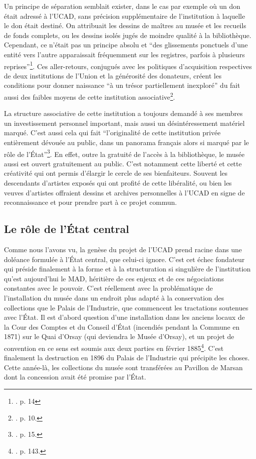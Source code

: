 Un principe de séparation semblait exister, dans le cas par exemple où un don était adressé à l'UCAD, sans précision supplémentaire de l'institution à laquelle le don était destiné. On attribuait les dessins de maîtres au musée et les recueils de fonds complets, ou les dessins isolés jugés de moindre qualité à la bibliothèque. Cependant, ce n'était pas un principe absolu et \enquote{des glissements ponctuels d'une entité vers l'autre apparaissait fréquemment sur les registres, parfois à plusieurs reprises}\footnote{\cite{gady_dessin_2020}. p. 14}. Ces aller-retours, conjugués avec les politiques d'acquisition respectives de deux institutions de l'Union et la générosité des donateurs, créent les conditions pour donner naissance \enquote{à un trésor partiellement inexploré} du fait aussi des faibles moyens de cette institution associative\footnote{\cite{gady_dessin_2020}. p. 10.}. 

La structure associative de cette institution a toujours demandé à ses membres un investissement personnel important, mais aussi un désintéressement matériel marqué. C'est aussi cela qui fait \enquote{l'originalité de cette institution privée entièrement dévouée au public, dans un panorama français alors si marqué par le rôle de l'État}\footnote{\cite{gady_dessin_2020}. p. 15.}. En effet, outre la gratuité de l'accès à la bibliothèque, le musée aussi est ouvert gratuitement au public. C'est notamment cette liberté et cette créativité qui ont permis d'élargir le cercle de ses bienfaiteurs. Souvent les descendants d'artistes exposés qui ont profité de cette libéralité, ou bien les veuves d'artistes offraient dessins et archives personnelles à l'UCAD en signe de reconnaissance et pour prendre part à ce projet commun. 

\subsection{Le rôle de l'État central}

Comme nous l'avons vu, la genèse du projet de l'UCAD prend racine dans une doléance formulée à l'État central, que celui-ci ignore. C'est cet échec fondateur qui préside finalement à la forme et à la structuration si singulière de l'institution qu'est aujourd'hui le MAD, héritière de ces enjeux et de ces négociations constantes avec le pouvoir. C'est réellement avec la problématique de l'installation du musée dans un endroit plus adapté à la conservation des collections que le Palais de l'Industrie, que commencent les tractations soutenues avec l'État. Il est d'abord question d'une installation dans les anciens locaux de la Cour des Comptes et du Conseil d'État (incendiés pendant la Commune en 1871) sur le Quai d'Orsay (qui deviendra le Musée d'Orsay), et un projet de convention en ce sens est soumis aux deux parties en février 1885\footnote{\cite{froissart_union_1990}. p. 143.}. C'est finalement la destruction en 1896 du Palais de l'Industrie qui précipite les choses. Cette année-là, les collections du musée sont transférées au Pavillon de Marsan dont la concession avait été promise par l'État. 


